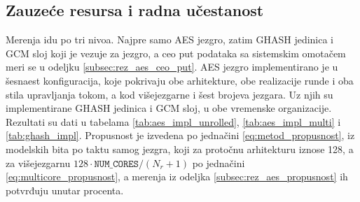 \subsection{Zauzeće resursa i radna učestanost}
\label{subsec:rez_aes_resursi}

Merenja idu po tri nivoa. Najpre samo AES jezgro, zatim GHASH jedinica i GCM sloj koji je vezuje za jezgro, a ceo put podataka sa sistemskim omotačem meri se u odeljku \ref{subsec:rez_aes_ceo_put}. AES jezgro implementirano je u šesnaest konfiguracija, koje pokrivaju obe arhitekture, obe realizacije runde i oba stila upravljanja tokom, a kod višejezgarne i šest brojeva jezgara. Uz njih su implementirane GHASH jedinica i GCM sloj, u obe vremenske organizacije. Rezultati su dati u tabelama \ref{tab:aes_impl_unrolled}, \ref{tab:aes_impl_multi} i \ref{tab:ghash_impl}. Propusnost je izvedena po jednačini \eqref{eq:metod_propusnost}, iz modelskih bita po taktu samog jezgra, koji za protočnu arhitekturu iznose 128, a za višejezgarnu $128 \cdot \texttt{NUM\_CORES}/(N_r+1)$ po jednačini \eqref{eq:multicore_propusnost}, a merenja iz odeljka \ref{subsec:rez_aes_propusnost} ih potvrđuju unutar procenta.

\begin{table}[H]
\caption{Protočna arhitektura, implementacija van konteksta}
\centering
{\renewcommand{\arraystretch}{1.25}
}
\label{tab:aes_impl_unrolled}
\end{table}

